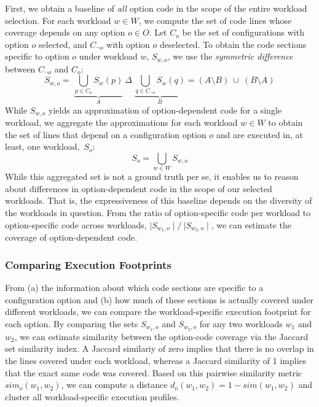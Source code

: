 {\color{red!70!black}
First, we obtain a baseline of \textit{all} option code in the scope of the entire workload selection. For each workload $w \in W$, we compute the set of code lines whose coverage depends on any option $o \in O$. 
Let $C_{o}$ be the set of configurations with option $o$ selected, and $C_{\neg o}$ with option $o$ deselected. To obtain the code sections specific to option $o$ under workload $w$, $S_{w, o}$, we use the \emph{symmetric difference} between  $C_{\neg o}$ and  $C_{o}$:
\begin{equation}%
	S_{w, o} = ~ \underbrace{\bigcup_{p \in C_{o}} S_{w}(p)}_{A} ~ \Delta ~ \underbrace{\bigcup_{q \in C_{\neg o}} S_{w}(q)}_{B} = (A \setminus B)~\cup~(B \setminus A)
\end{equation}
While $S_{w, o}$ yields an approximation of option-dependent code for a single workload, we aggregate the approximations for each workload $w\in W$ to obtain the set of lines that depend on a configuration option $o$ and are executed in, at least, one workload,~$S_{o}$: 
\begin{equation}
	S_{o} = \bigcup_{w \in W} S_{w, o}
\end{equation}
While this aggregated set is not a ground truth per se, it enables us to reason about differences in option-dependent code in the scope of our selected workloads. That is, the expressiveness of this baseline depends on the diversity of the workloads in question. From the ratio of option-specific code per workload to option-specific code across workloads, $\mid S_{w_1, o}\mid/~{\mid S_{w_2, o}\mid}$, we can estimate the coverage of option-dependent code. 
}

\subsubsection{Comparing Execution Footprints}
From (a) the information about which code sections are specific to a configuration option and (b) how much of these sections is actually covered under different workloads, we can compare the workload-specific execution footprint for each option. By comparing the sets $S_{w_1, o}$ and $S_{w_2, o}$ for any two workloads $w_1$ and $w_2$, we can estimate similarity between the option-code coverage via the Jaccard set similarity index. A Jaccard similariy of zero implies that there is no overlap in the lines covered under each workload, whereas a Jaccard similarity of 1 implies that the exact same code was covered. Based on this pairwise similarity metric $sim_o(w_1, w_2)$, we can compute a distance $d_o(w_1, w_2) = 1 - sim(w_1, w_2)$ and cluster all workload-specific execution profiles. 

